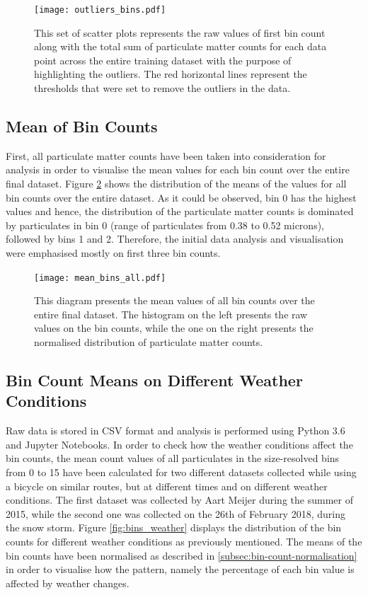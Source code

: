 \documentclass[bsc,frontabs,twoside,singlespacing, parskip,deptreport]{infthesis}     %
\begin{document}
\begin{figure}[h!]
  \center
  \texttt{[image: outliers\_bins.pdf]}
  \caption{This set of scatter plots represents the raw values of first bin count along with the total sum of particulate matter counts for each data point across the entire training dataset with the purpose of highlighting the outliers. The red horizontal lines represent the thresholds that were set to remove the outliers in the data.}
  \label{fig:outliers-bins}
\end{figure}


\subsection{Mean of Bin Counts}
\label{subsec:bin-count-means}

First, all particulate matter counts have been taken into consideration for analysis in order to visualise the mean values for each bin count over the entire final dataset. Figure \ref{fig:mean_bins_all} shows the distribution of the means of the values for all bin counts over the entire dataset. As it could be observed, bin 0 has the highest values and hence, the distribution of the particulate matter counts is dominated by particulates in bin 0 (range of particulates from 0.38 to 0.52 microns), followed by bins 1 and 2. Therefore, the initial data analysis and visualisation were emphasised mostly on first three bin counts.

\begin{figure}[h!]
  \center
  \texttt{[image: mean\_bins\_all.pdf]}
  \caption{This diagram presents the mean values of all bin counts over the entire final dataset. The histogram on the left presents the raw values on the bin counts, while the one on the right presents the normalised distribution of particulate matter counts.}
  \label{fig:mean_bins_all}
\end{figure}


\subsection{Bin Count Means on Different Weather Conditions}
\label{subsec:different-weather}

Raw data is stored in CSV format and analysis is performed using Python 3.6 and Jupyter Notebooks. In order to check how the weather conditions affect the bin counts, the mean count values of all particulates in the size-resolved bins from 0 to 15 have been calculated for two different datasets collected while using a bicycle on similar routes, but at different times and on different weather conditions. The first dataset was collected by Aart Meijer during the summer of 2015, while the second one was collected on the 26th of February 2018, during the snow storm. Figure \ref{fig:bins_weather} displays the distribution of the bin counts for different weather conditions as previously mentioned. The means of the bin counts have been normalised as described in \ref{subsec:bin-count-normalisation} in order to visualise how the pattern, namely the percentage of each bin value is affected by weather changes.
\end{document}
